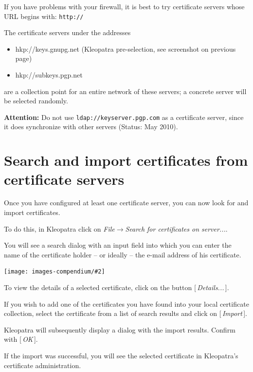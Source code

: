 \documentclass[a4paper,11pt,oneside,openright,titlepage]{scrbook}
\newcommand{\Button}[1]{[\,\textit{#1}\,]}
\newcommand{\Menu}[1]{\textit{#1}}
\newcommand{\Filename}[1]{\small{\texttt{#1}}\normalsize}
\newcommand{\Email}{e-mail}
\newcommand{\IncludeImage}[2][]{
\begin{center}
  \texttt{[image: images-compendium/\#2]}%
\end{center}
}
\begin{document}
If you have problems with your firewall, it is best to try certificate
servers whose URL begins with: \Filename{http://}

The certificate servers under the addresses

\begin{itemize}
    \item hkp://keys.gnupg.net (Kleopatra pre-selection, see screenshot on previous page)
    \item hkp://subkeys.pgp.net
\end{itemize}
are a collection point for an entire network of these servers; a
concrete server will be selected randomly.

\textbf{Attention:} Do not use \Filename{ldap://keyserver.pgp.com} as
a certificate server, since it does synchronize with other servers (Status:
May 2010).

\clearpage
\section{Search and import certificates from certificate servers}
\label{searchAndImportCertificateFromServer}

Once you have configured at least one certificate server, you can now look for
and import certificates.

To do this, in Kleopatra click on \Menu{File$\rightarrow$Search for
certificates on server...}.

You will see a search dialog with an input field into which you can
enter the name of the certificate holder -- or ideally -- the \Email{}
address of his certificate.


\IncludeImage[width=0.85\textwidth]{sc-kleopatra-certificateSearchOnKeyserver_en}

To view the details of a selected certificate, click on the button
\Button{Details...}.

If you wish to add one of the certificates you have found into your
local certificate collection, select the certificate from a list of
search results and click on \Button{Import}.

Kleopatra will subsequently display a dialog with the import results.
Confirm with \Button{OK}.

If the import was successful, you will see the selected certificate in
Kleopatra's certificate administration.
\end{document}
